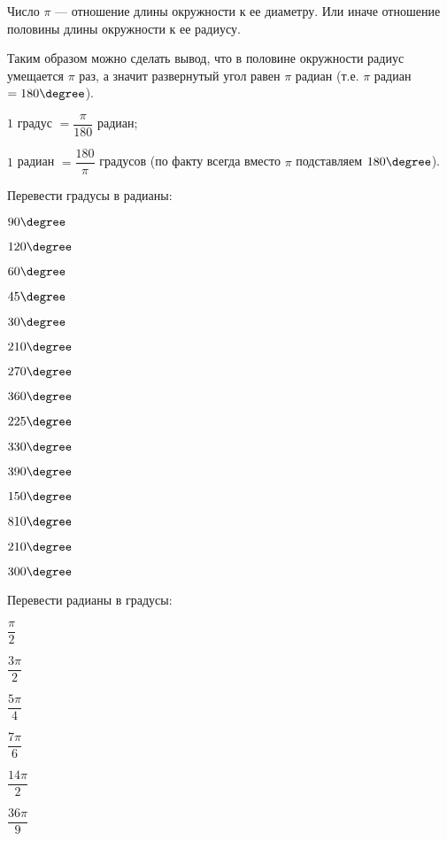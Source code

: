 \begin{class}[number=3]
	\begin{definit}
		Число \( \pi \) --- отношение длины окружности к ее диаметру. Или иначе отношение половины длины окружности к ее радиусу.
	\end{definit}
	Таким образом можно сделать вывод, что в половине окружности радиус умещается \( \pi \) раз, а значит развернутый угол равен \( \pi \) радиан (т.е. \( \pi \) радиан \( = 180\degree \)).
	\begin{enumcols}
		\item \( 1 \) градус \( = \dfrac{\pi}{180} \) радиан;
		\item \( 1 \) радиан \( = \dfrac{180}{\pi}\) градусов (по факту всегда вместо \( \pi \) подставляем \( 180\degree \)).
	\end{enumcols}
	\begin{listofex}[resume]
		\item Перевести градусы в радианы:
		\begin{enumcols}[itemcolumns=5]
			\item \( 90\degree \)
			\item \( 120\degree \)
			\item \( 60\degree \)
			\item \( 45\degree \)
			\item \( 30\degree \)
			\item \( 210\degree \)
			\item \( 270\degree \)
			\item \( 360\degree \)
			\item \( 225\degree \)
			\item \( 330\degree \)
			\item \( 390\degree \)
			\item \( 150\degree \)
			\item \( 810\degree \)
			\item \( 210\degree \)
			\item \( 300\degree \)
		\end{enumcols}
		\newpage
		\item Перевести радианы в градусы:
		\begin{enumcols}[itemcolumns=5]
			\item \( \dfrac{\pi}{2} \)
			\item \( \dfrac{3\pi}{2} \)
			\item \( \dfrac{5\pi}{4} \)
			\item \( \dfrac{7\pi}{6} \)
			\item \( \dfrac{14\pi}{2} \)
			\item \( \dfrac{36\pi}{9} \)

\end{enumcols}
\end{listofex}
\end{class}
